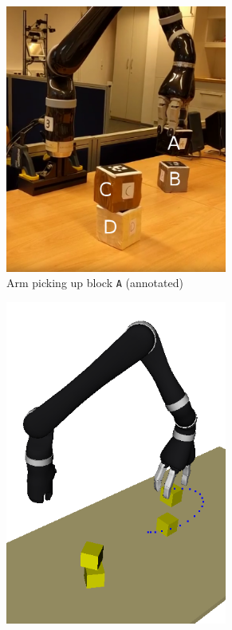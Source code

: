 \begin{figure}
  \centering
  \begin{subfigure}[b]{0.49\textwidth}
  \centering
  \includegraphics[width=0.8\textwidth]{img/blocks-world-annotated}%
  \caption[Arm picking up block \texttt{A} (annotated)]{Arm
    picking up block \texttt{A} (annotated)}
  \label{fig:blocksworld}
  \end{subfigure}
\hfill
  \begin{subfigure}[b]{0.49\textwidth}
  \centering
  \includegraphics[width=0.8\textwidth]{img/openrave-blocks}%

\end{subfigure}
\end{figure}
